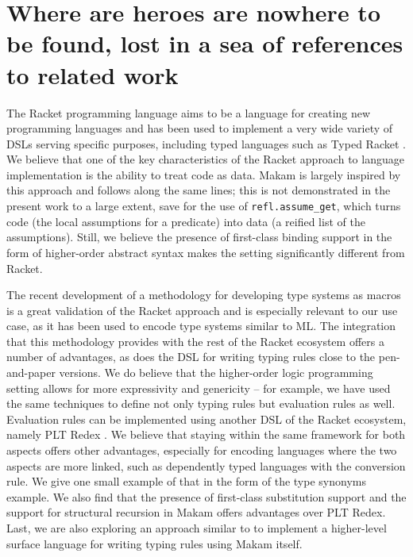\section{Where are heroes are nowhere to be found, lost in a sea of
references to related
work}\label{where-are-heroes-are-nowhere-to-be-found-lost-in-a-sea-of-references-to-related-work}

\identNormal

 The Racket programming language aims to be a language
for creating new programming languages \citep{racket-manifesto} and has
been used to implement a very wide variety of DSLs serving specific
purposes, including typed languages such as Typed Racket
\citet{typed-racket-main-reference}. We believe that one of the key
characteristics of the Racket approach to language implementation is the
ability to treat code as data. Makam is largely inspired by this
approach and follows along the same lines; this is not demonstrated in
the present work to a large extent, save for the use of
\texttt{refl.assume\_get}, which turns code (the local assumptions for a
predicate) into data (a reified list of the assumptions). Still, we
believe the presence of first-class binding support in the form of
higher-order abstract syntax makes the \lamprolog setting significantly
different from Racket.

The recent development of a methodology for developing type systems as
macros \citet{racket-type-systems-as-macros} is a great validation of
the Racket approach and is especially relevant to our use case, as it
has been used to encode type systems similar to ML. The integration that
this methodology provides with the rest of the Racket ecosystem offers a
number of advantages, as does the  DSL for writing
typing rules close to the pen-and-paper versions. We do believe that the
higher-order logic programming setting allows for more expressivity and
genericity -- for example, we have used the same techniques to define
not only typing rules but evaluation rules as well. Evaluation rules can
be implemented using another DSL of the Racket ecosystem, namely PLT
Redex \citep{felleisen2009semantics}. We believe that staying within the
same framework for both aspects offers other advantages, especially for
encoding languages where the two aspects are more linked, such as
dependently typed languages with the conversion rule. We give one small
example of that in the form of the type synonyms example. We also find
that the presence of first-class substitution support and the support
for structural recursion in Makam offers advantages over PLT Redex.
Last, we are also exploring an approach similar to 
to implement a higher-level surface language for writing typing rules
using Makam itself.

